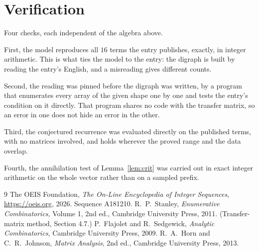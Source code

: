 \documentclass[11pt,a4paper]{article}
\theoremstyle{plain}
\theoremstyle{definition}
\begin{document}
\section{Verification}

Four checks, each independent of the algebra above.

First, the model reproduces all $16$ terms the entry publishes, exactly, in integer
arithmetic. This is what ties the model to the entry: the digraph is built by reading the
entry's English, and a misreading gives different counts.

Second, the reading was pinned before the digraph was written, by a program that enumerates
every array of the given shape one by one and tests the entry's condition on it directly. That program shares no code with the transfer matrix, so an error in one does not
hide an error in the other.

Third, the conjectured recurrence was evaluated directly on the published terms, with no
matrices involved, and holds wherever the proved range and the data overlap.

Fourth, the annihilation test of Lemma~\ref{lem:crit} was carried out in exact integer
arithmetic on the whole vector rather than on a sampled prefix.

\begin{thebibliography}{9}
 The OEIS Foundation, \emph{The On-Line Encyclopedia of Integer
Sequences}, \url{https://oeis.org}, 2026. Sequence A181210.
 R.~P.~Stanley, \emph{Enumerative Combinatorics}, Volume 1, 2nd ed.,
Cambridge University Press, 2011. (Transfer-matrix method, Section 4.7.)
 P.~Flajolet and R.~Sedgewick, \emph{Analytic Combinatorics}, Cambridge
University Press, 2009.
 R.~A.~Horn and C.~R.~Johnson, \emph{Matrix Analysis}, 2nd ed., Cambridge
University Press, 2013.
\end{thebibliography}
\end{document}
